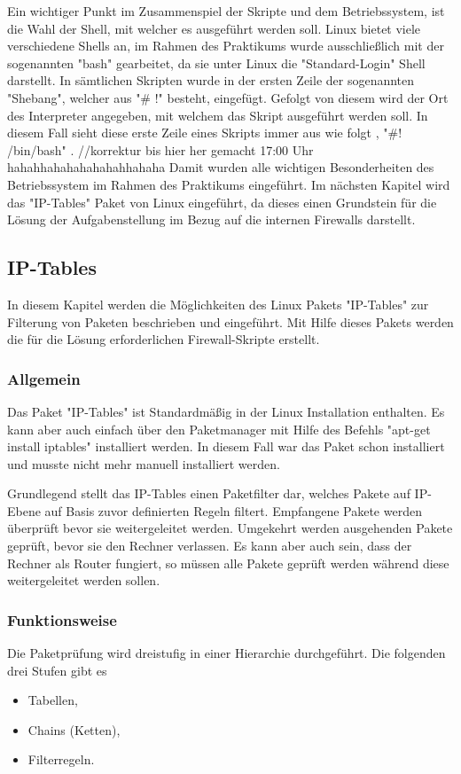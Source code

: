 \documentclass[
a4paper,     %
 headsepline, %
footsepline, %
titlepage,   %
 halfparskip,     %
 fleqn,       %
12pt         %
]{scrartcl}  %
\begin{document}
Ein wichtiger Punkt im Zusammenspiel der Skripte und dem Betriebssystem, ist die Wahl der Shell, mit welcher es ausgeführt werden soll. Linux bietet viele verschiedene Shells an, im Rahmen des Praktikums wurde ausschließlich mit der sogenannten "bash" gearbeitet, da sie unter Linux die "Standard-Login" Shell darstellt\cite{bash-2}. In sämtlichen Skripten wurde in der ersten Zeile der sogenannten "Shebang", welcher aus "\# !" besteht, eingefügt. Gefolgt von diesem wird der Ort des Interpreter angegeben, mit welchem das Skript ausgeführt werden soll. In diesem Fall sieht diese erste Zeile eines Skripts immer aus wie folgt , "\#! /bin/bash" \cite{shebang-1}. 
//korrektur bis hier her gemacht 17:00 Uhr hahahhahahahahahahhahaha
Damit wurden alle wichtigen Besonderheiten des Betriebssystem im Rahmen des Praktikums eingeführt. Im nächsten Kapitel wird das "IP-Tables" Paket von Linux eingeführt, da dieses einen Grundstein für die Lösung der Aufgabenstellung im Bezug auf die internen Firewalls darstellt. 
\subsection{IP-Tables}\label{iptables}
In diesem Kapitel werden die Möglichkeiten des Linux Pakets "IP-Tables" zur Filterung von Paketen beschrieben und eingeführt. Mit Hilfe dieses Pakets werden die für die Lösung erforderlichen Firewall-Skripte erstellt.  

\subsubsection{Allgemein}
Das Paket "IP-Tables" ist Standardmäßig in der Linux Installation enthalten. Es kann aber auch einfach über den Paketmanager mit Hilfe des Befehls "apt-get install iptables" installiert werden. In diesem Fall war das Paket schon installiert und musste nicht mehr manuell installiert werden. 

Grundlegend stellt das IP-Tables einen Paketfilter dar, welches Pakete auf IP-Ebene auf Basis zuvor definierten Regeln filtert. Empfangene Pakete werden überprüft bevor sie weitergeleitet werden. Umgekehrt werden ausgehenden Pakete geprüft, bevor sie den Rechner verlassen. Es kann aber auch sein, dass der Rechner als Router fungiert, so müssen alle Pakete geprüft werden während diese weitergeleitet werden sollen. 
\subsubsection{Funktionsweise}
Die Paketprüfung wird dreistufig in einer Hierarchie durchgeführt. Die folgenden drei Stufen gibt es 
\begin{itemize}
\item Tabellen,
\item Chains (Ketten),
\item Filterregeln.
\end{itemize}
\end{document}
